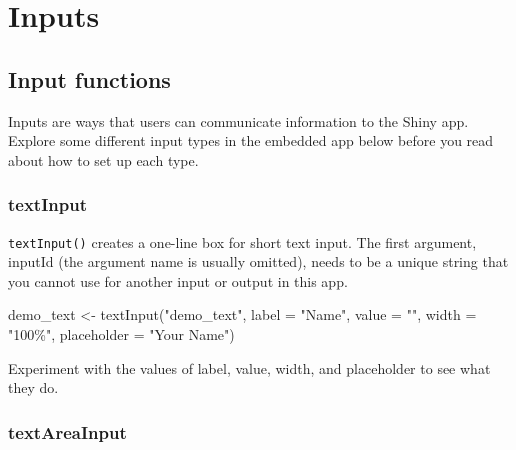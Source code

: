 \documentclass[
  oneside]{book}
\newenvironment{Shaded}{\begin{snugshade}}{\end{snugshade}}
\newcommand{\AttributeTok}[1]{\textcolor[rgb]{0.77,0.63,0.00}{#1}}
\newcommand{\FunctionTok}[1]{\textcolor[rgb]{0.00,0.00,0.00}{#1}}
\newcommand{\NormalTok}[1]{#1}
\newcommand{\OtherTok}[1]{\textcolor[rgb]{0.56,0.35,0.01}{#1}}
\newcommand{\StringTok}[1]{\textcolor[rgb]{0.31,0.60,0.02}{#1}}
\begin{document}
\hypertarget{inputs}{%
\chapter{Inputs}\label{inputs}}

\hypertarget{input-functions}{%
\section{Input functions}\label{input-functions}}

Inputs are ways that users can communicate information to the Shiny app. Explore some different input types in the embedded app below before you read about how to set up each type.

\hypertarget{textinput}{%
\subsection{textInput}\label{textinput}}

\texttt{textInput}\texttt{()} creates a one-line box for short text input. The first argument, \AttributeTok{inputId} (the argument name is usually omitted), needs to be a unique string that you cannot use for another input or output in this app.

\begin{Shaded}
\begin{Highlighting}[]
\NormalTok{demo\_text }\OtherTok{\textless{}{-}} 
  \FunctionTok{textInput}\NormalTok{(}\StringTok{"demo\_text"}\NormalTok{, }
            \AttributeTok{label =} \StringTok{"Name"}\NormalTok{, }
            \AttributeTok{value =} \StringTok{""}\NormalTok{, }
            \AttributeTok{width =} \StringTok{"100\%"}\NormalTok{,}
            \AttributeTok{placeholder =} \StringTok{"Your Name"}\NormalTok{)}
\end{Highlighting}
\end{Shaded}

\begin{try}
Experiment with the values of \AttributeTok{label}, \AttributeTok{value}, \AttributeTok{width}, and \AttributeTok{placeholder} to see what they do.

\end{try}

\hypertarget{textareainput}{%
\subsection{textAreaInput}\label{textareainput}}
\end{document}
